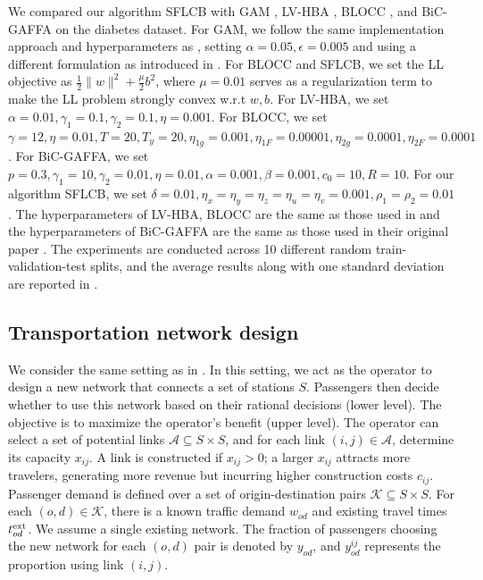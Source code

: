 \documentclass{article}
\theoremstyle{plain}
\theoremstyle{definition}
\theoremstyle{remark}
\begin{document}
We compared our algorithm SFLCB with GAM \citep{xu2023efficient}, LV-HBA \citep{yao2024constrained}, BLOCC \citep{jiang2024primal}, and BiC-GAFFA \citep{yao2024overcoming} on the diabetes dataset. For GAM,  we follow the same implementation approach and hyperparameters as \cite{jiang2024primal}, setting $\alpha=0.05, \epsilon=0.005$ and using a different formulation as introduced in \cite{xu2023efficient}. For BLOCC and SFLCB, we set the LL objective as $\frac{1}{2}\|w\|^2+\frac{\mu}{2}b^2$, where $\mu=0.01$ serves as a regularization term to make the LL problem strongly convex w.r.t $w,b$.
For LV-HBA, we set $\alpha=0.01, \gamma_1=0.1, \gamma_2=0.1, \eta=0.001$. For BLOCC, we set $\gamma=12, \eta=0.01, T=20, T_y=20, \eta_{1g}=0.001, \eta_{1F}=0.00001, \eta_{2g}=0.0001, \eta_{2F}=0.0001$. 
For BiC-GAFFA, we set $p=0.3, \gamma_1=10, \gamma_2=0.01, \eta=0.01, \alpha=0.001, \beta=0.001, c_0=10, R=10$. For our algorithm SFLCB, we set $\delta=0.01, \eta_x=\eta_y=\eta_z=\eta_u=\eta_v=0.001, \rho_1=\rho_2=0.01$. The hyperparameters of LV-HBA, BLOCC are the same as those used in \cite{jiang2024primal} and the hyperparameters of BiC-GAFFA are the same as those used in their original paper \citep{yao2024overcoming}. The experiments are conducted across 10 different random train-validation-test splits, and the average results along with one standard deviation are reported in .

\subsection{Transportation network design}
We consider the same setting as in \cite{jiang2024primal}. In this setting, we act as the operator to design a new network that connects a set of stations $S$. Passengers then decide whether to use this network based on their rational decisions (lower level). The objective is to maximize the operator's benefit (upper level). The operator can select a set of potential links $\mathcal{A}\subseteq S\times S$, and for each link $(i,j)\in \mathcal{A}$, determine its capacity $x_{ij}$. A link is constructed if $x_{ij}>0$; a larger $x_{ij}$ attracts more travelers, generating more revenue but incurring higher construction costs $c_{ij}$. Passenger demand is defined over a set of origin-destination pairs $\mathcal{K}\subseteq S\times S$. For each $(o,d)\in \mathcal{K}$, there is a known traffic demand $w_{od}$ and existing travel times $t^{\rm ext}_{od}$. We assume a single existing network. The fraction of passengers choosing the new network for each 
$(o,d)$ pair is denoted by $y_{od}$, and $y^{ij}_{od}$ represents the proportion using link $(i,j)$.
\end{document}
